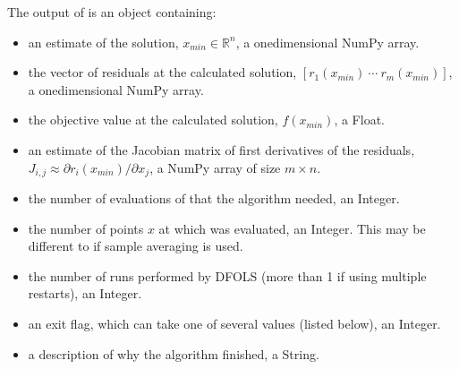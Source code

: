 \documentclass[letterpaper,10pt,english]{sphinxmanual}
\begin{document}
\sphinxAtStartPar
The output of  is an object containing:
\begin{itemize}
\item {} 
\sphinxAtStartPar
{} \sphinxhyphen{} an estimate of the solution, \(x_{min}\in\mathbb{R}^n\), a one\sphinxhyphen{}dimensional NumPy array.

\item {} 
\sphinxAtStartPar
{} \sphinxhyphen{} the vector of residuals at the calculated solution, \([r_1(x_{min})\:\cdots\: r_m(x_{min})]\), a one\sphinxhyphen{}dimensional NumPy array.

\item {} 
\sphinxAtStartPar
{} \sphinxhyphen{} the objective value at the calculated solution, \(f(x_{min})\), a Float.

\item {} 
\sphinxAtStartPar
{} \sphinxhyphen{} an estimate of the Jacobian matrix of first derivatives of the residuals, \(J_{i,j} \approx \partial r_i(x_{min})/\partial x_j\), a NumPy array of size \(m\times n\).

\item {} 
\sphinxAtStartPar
{} \sphinxhyphen{} the number of evaluations of  that the algorithm needed, an Integer.

\item {} 
\sphinxAtStartPar
{} \sphinxhyphen{} the number of points \(x\) at which  was evaluated, an Integer. This may be different to  if sample averaging is used.

\item {} 
\sphinxAtStartPar
{} \sphinxhyphen{} the number of runs performed by DFO\sphinxhyphen{}LS (more than 1 if using multiple restarts), an Integer.

\item {} 
\sphinxAtStartPar
{} \sphinxhyphen{} an exit flag, which can take one of several values (listed below), an Integer.

\item {} 
\sphinxAtStartPar
{} \sphinxhyphen{} a description of why the algorithm finished, a String.


\end{itemize}
\end{document}
